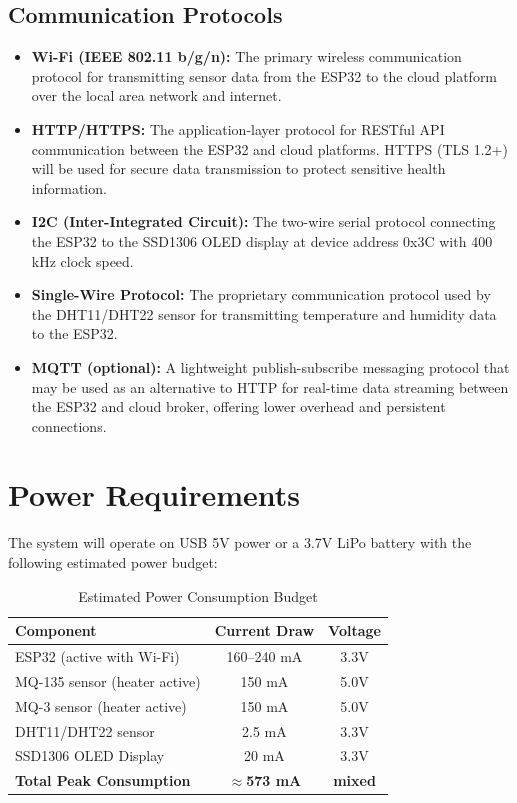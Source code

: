 \subsection{Communication Protocols}
\begin{itemize}[leftmargin=1.5cm]
\item \textbf{Wi-Fi (IEEE 802.11 b/g/n):} The primary wireless communication protocol for transmitting sensor data from the ESP32 to the cloud platform over the local area network and internet.

\item \textbf{HTTP/HTTPS:} The application-layer protocol for RESTful API communication between the ESP32 and cloud platforms. HTTPS (TLS 1.2+) will be used for secure data transmission to protect sensitive health information.

\item \textbf{I2C (Inter-Integrated Circuit):} The two-wire serial protocol connecting the ESP32 to the SSD1306 OLED display at device address 0x3C with 400 kHz clock speed.

\item \textbf{Single-Wire Protocol:} The proprietary communication protocol used by the DHT11/DHT22 sensor for transmitting temperature and humidity data to the ESP32.

\item \textbf{MQTT (optional):} A lightweight publish-subscribe messaging protocol that may be used as an alternative to HTTP for real-time data streaming between the ESP32 and cloud broker, offering lower overhead and persistent connections.
\end{itemize}

\section{Power Requirements}
The system will operate on USB 5V power or a 3.7V LiPo battery with the following estimated power budget:

\begin{table}[h]
\centering
\begin{tabular}{|l|c|c|}
\hline
\textbf{Component} & \textbf{Current Draw} & \textbf{Voltage} \\
\hline
ESP32 (active with Wi-Fi) & 160--240 mA & 3.3V \\
MQ-135 sensor (heater active) & 150 mA & 5.0V \\
MQ-3 sensor (heater active) & 150 mA & 5.0V \\
DHT11/DHT22 sensor & 2.5 mA & 3.3V \\
SSD1306 OLED Display & 20 mA & 3.3V \\
\hline
\textbf{Total Peak Consumption} & \textbf{$\approx$573 mA} & \textbf{mixed} \\
\hline
\end{tabular}
\caption{Estimated Power Consumption Budget}
\end{table}


